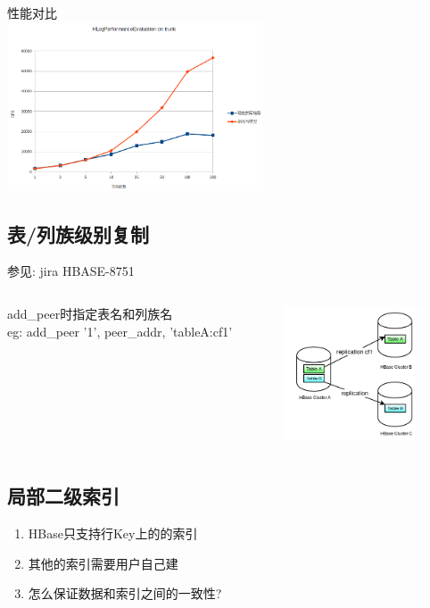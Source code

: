 \documentclass[xcolor=table]{beamer}
\begin{document}
\begin{CJK}{UTF8}{gkai}
\begin{frame}{\subsecname}
	性能对比\\

	\bigskip
	\includegraphics[width=\textwidth, height=5cm]{new-write-model-ops.png}
\end{frame}

\subsection{表/列族级别复制}
\begin{frame}{\subsecname}
	参见: jira HBASE-8751
	\begin{columns}
	\begin{column}{0.5\textwidth}
	add\_peer时指定表名和列族名 \\
	eg: add\_peer '1', peer\_addr, 'tableA:cf1'
	\end{column}
	\begin{column}{0.5\textwidth}
	\includegraphics[width=\textwidth, height=4cm]{replication.png}
	\end{column}
\end{columns}
\end{frame}

\subsection{局部二级索引}
\begin{frame}{\subsecname}
	\begin{enumerate}
		\item HBase只支持行Key上的的索引
		\item 其他的索引需要用户自己建
		\item 怎么保证数据和索引之间的一致性? \\
	\end{enumerate}
	\bigskip
\end{frame}


\end{CJK}
\end{document}
